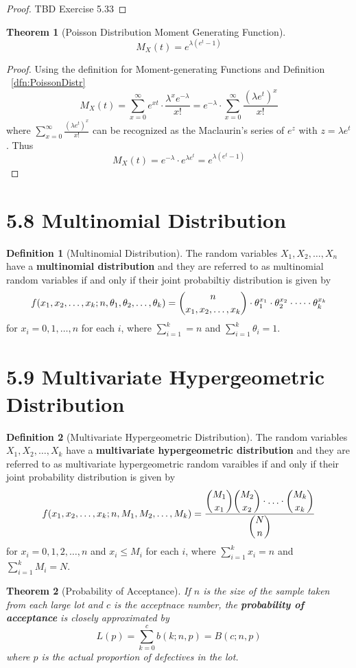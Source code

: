 \documentclass[
10pt,reqno
]{amsart}
\newtheorem{theorem}{Theorem}[section]
\theoremstyle{definition}
\newtheorem{definition}{Definition}[section]
\begin{document}
\begin{proof}
TBD Exercise 5.33
\end{proof}

\begin{theorem}[Poisson Distribution Moment Generating Function]
\[
M_X(t)=e^{\lambda(e^t-1)}
\]
\end{theorem}

\begin{proof}
Using the definition for Moment-generating Functions and Definition ~\ref{dfn:PoissonDistr} 
\[
M_X(t)=\sum_{x=0}^\infty e^{xt} \cdot \frac{\lambda^x e^{-\lambda}}{x!} = e^{-\lambda} \cdot \sum_{x=0}^\infty \frac{(\lambda e^{t})^x}{x!} 
\]
where \(\sum_{x=0}^\infty \frac{(\lambda e^{t})^x}{x!}\) can be recognized as the Maclaurin's series of \(e^z\) with \(z=\lambda e^t\). Thus
\[
M_X(t)=e^{- \lambda} \cdot e^{\lambda e^t}=e^{\lambda (e^t - 1)}
\]
\end{proof}

\section*{5.8 Multinomial Distribution}

\begin{definition}[Multinomial Distribution] 
The random variables \(X_1, X_2,\dots,X_n\) have a \textbf{multinomial distribution} and they are referred to as multinomial random variables if and only if their joint probabiltiy distribution is given by
\[
f(x_1,x_2,\dots,x_k;n,\theta_1, \theta_2,\dots,\theta_k)= \dbinom n {x_1, x_2, \dots, x_k} \cdot \theta_1^{x_1} \cdot \theta_2^{x_2} \cdot \dots \cdot \theta_k^{x_k}
\]
for \(x_i=0,1,\dots,n\) for each \(i\), where \(\sum_{i=1}^k=n\) and \(\sum_{i=1}^k \theta_i=1\).
\end{definition}

\section*{5.9 Multivariate Hypergeometric Distribution}

\begin{definition}[Multivariate Hypergeometric Distribution]
The random variables \(X_1, X_2,\dots,X_k\) have a \textbf{multivariate hypergeometric distribution} and they are referred to as multivariate hypergeometric random varaibles if and only if their joint probability distribution is given by
\[
f(x_1,x_2,\dots,x_k;n,M_1,M_2,\dots,M_k)= \frac{ \dbinom {M_1} {x_1} \dbinom {M_2} {x_2} \cdot \ldots \cdot \dbinom {M_k} {x_k}}{\dbinom N n}
\]
for \(x_i=0,1,2, \dots ,n\) and \(x_i \le M_i\) for each \(i\), where \(\sum_{i=1}^k x_i = n\) and \(\sum_{i=1}^k M_i = N\).
\end{definition}

\begin{theorem}[Probability of Acceptance]
If \(n\) is the size of the sample taken from each large lot and \(c\) is the acceptnace number, the \textbf{probability of acceptance} is closely approximated by
\[
L(p) = \sum_{k=0}^c b(k;n,p)=B(c;n,p)
\]
where \(p\) is the actual proportion of defectives in the lot.
\end{theorem}
\end{document}
